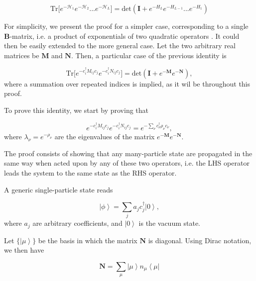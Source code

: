 \documentclass[10pt, twocolumn, twoside]{article}
\begin{document}
\begin{equation}\label{eq:quadraticIdentity}
\text{Tr} \big[ e^{-\mathcal{H}_1 } e^{-\mathcal{H}_2 } ... e^{-\mathcal{H}_L } \big] = \text{det} ( \bm I + e^{-H_L} e^{-H_{L-1}} ... e^{-H_1} )
\end{equation}

For simplicity, we present the proof for a simpler case, corresponding to a single $\bm B$-matrix, i.e. a product of exponentials of two quadratic operators \cite{Hirsch1985}. It could then be easily extended to the more general case. Let the two arbitrary real matrices be $\bm M$ and $\bm N$. Then, a particular case of the previous identity is

\begin{equation}\label{eq:particularIdentity}
\text{Tr} \big[ e^{-c_i^\dagger M_{ij} c_j} e^{-c_i^\dagger N_{ij} c_j} \big] = \text{det} ( \bm I + e^{-{\bm M}} e^{-{\bm N}} ) ,
\end{equation}
where a summation over repeated indices is implied, as it wil be throughout this proof.

To prove this identity, we start by proving that

\begin{equation}\label{eq:identity_prod_exps}
e^{-c_i^\dagger M_{ij} c_j}  e^{-c_i^\dagger N_{ij} c_j} = e^{-\sum_\nu c_\nu^\dagger \rho_\nu c_\nu} ,
\end{equation}
where $\lambda_\nu = e^{-\rho_\nu}$ are the eigenvalues of the matrix $e^{-{\bm M}} e^{-{\bm N}}$.

The proof consists of showing that any many-particle state are propagated in the same way when acted upon by any of these two operators, i.e. the LHS operator leads the system to the same state as the RHS operator.

A generic single-particle state reads

\begin{equation}
\left| \phi \right\rangle = \sum_j a_j c_j^\dagger \left| 0 \right\rangle ,
\end{equation}
where $a_j$ are arbitrary coefficients, and $\left| 0 \right\rangle$ is the vacuum state.

Let $\{\left| \mu \right\rangle \}$ be the basis in which the matrix $\bm N$ is diagonal. Using Dirac notation, we then have

\begin{equation}
\bm N = \sum_{\mu} \left| \mu \right\rangle n_\mu \left\langle \mu \right|
\end{equation}
\end{document}
